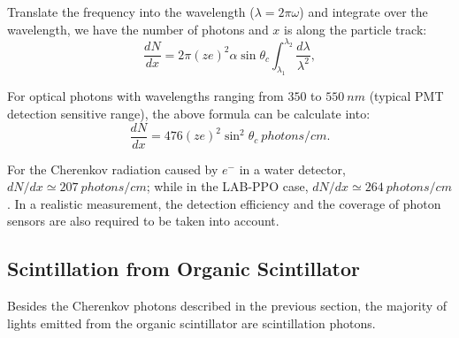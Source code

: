 Translate the frequency into the wavelength ($\lambda=2\pi\omega$) and integrate over the wavelength, we have the number of photons and $x$ is along the particle track\cite{leo2012techniques}:
\[
\frac{dN}{dx}=2\pi (ze)^2\alpha\sin\theta_c\int_{\lambda_1}^{\lambda_2}\frac{d\lambda}{\lambda^2},
\]

For optical photons with wavelengths ranging from $350$ to $550~nm$ (typical PMT detection sensitive range), the above formula can be calculate into\cite{leo2012techniques}:
\[
\frac{dN}{dx}=476(ze)^2\sin^2\theta_c~photons/cm.
\]

For the Cherenkov radiation caused by $e^-$ in a water detector, $dN/dx \simeq 207~photons/cm$; while in the LAB-PPO case, $dN/dx \simeq 264~photons/cm$. In a realistic measurement, the detection efficiency and the coverage of photon sensors are also required to be taken into account.

\subsection{Scintillation from Organic Scintillator}

Besides the Cherenkov photons described in the previous section, the majority of lights emitted from the organic scintillator are scintillation photons.

